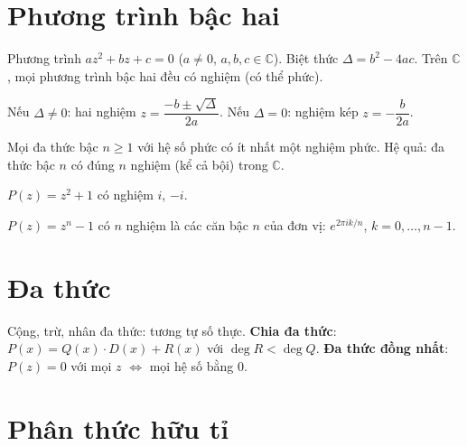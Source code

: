 \documentclass[12pt,a4paper]{article}
\begin{document}
\section{Phương trình bậc hai}

\begin{dinhnghia}
  Phương trình $az^2 + bz + c = 0$ ($a \ne 0$, $a, b, c \in \mathbb{C}$). Biệt thức $\Delta = b^2 - 4ac$. Trên $\mathbb{C}$, mọi phương trình bậc hai đều có nghiệm (có thể phức).
\end{dinhnghia}

\begin{congthuc}
  Nếu $\Delta \ne 0$: hai nghiệm $z = \dfrac{-b \pm \sqrt{\Delta}}{2a}$. Nếu $\Delta = 0$: nghiệm kép $z = -\dfrac{b}{2a}$.
\end{congthuc}

\begin{dinhly}[title={Định lý cơ bản của đại số}]
  Mọi đa thức bậc $n \ge 1$ với hệ số phức có ít nhất một nghiệm phức. Hệ quả: đa thức bậc $n$ có đúng $n$ nghiệm (kể cả bội) trong $\mathbb{C}$.
\end{dinhly}

\begin{vidu}
  $P(z) = z^2 + 1$ có nghiệm $i$, $-i$. 
  
  $P(z) = z^n - 1$ có $n$ nghiệm là các căn bậc $n$ của đơn vị: $e^{2\pi ik/n}$, $k = 0, \ldots, n-1$.
\end{vidu}


\section{Đa thức}

\begin{tinhchat}[title={Phép toán trên đa thức}]
  Cộng, trừ, nhân đa thức: tương tự số thực. \textbf{Chia đa thức}: $P(x) = Q(x) \cdot D(x) + R(x)$ với $\deg R < \deg Q$. \textbf{Đa thức đồng nhất}: $P(z) = 0$ với mọi $z$ $\Leftrightarrow$ mọi hệ số bằng 0.
\end{tinhchat}


\section{Phân thức hữu tỉ}
\end{document}
